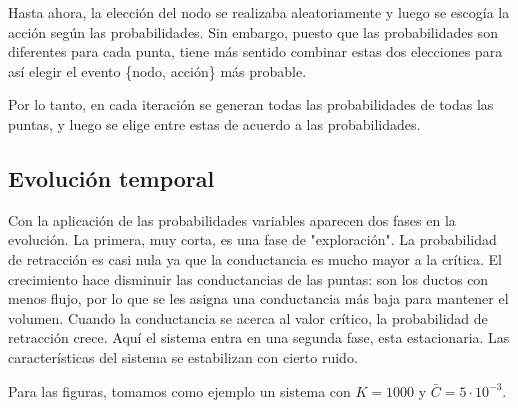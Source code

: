 \documentclass{article}
\begin{document}
Hasta ahora, la elección del nodo se realizaba aleatoriamente y luego se escogía la acción según las probabilidades. Sin embargo, puesto que las probabilidades son diferentes para cada punta, tiene más sentido combinar estas dos elecciones para así elegir el evento \{nodo, acción\} más probable.

Por lo tanto, en cada iteración se generan todas las probabilidades de todas las puntas, y luego se elige entre estas de acuerdo a las probabilidades.

\subsection{Evolución temporal}

Con la aplicación de las probabilidades variables aparecen dos fases en la evolución. La primera, muy corta, es una fase de "exploración". La probabilidad de retracción es casi nula ya que la conductancia es mucho mayor a la crítica. El crecimiento hace disminuir las conductancias de las puntas: son los ductos con menos flujo, por lo que se les asigna una conductancia más baja para mantener el volumen. Cuando la conductancia se acerca al valor crítico, la probabilidad de retracción crece. Aquí el sistema entra en una segunda fase, esta estacionaria. Las características del sistema se estabilizan con cierto ruido.

Para las figuras, tomamos como ejemplo un sistema con $K = 1000$ y $\bar{C} = 5\cdot10^{-3}$.
\end{document}
